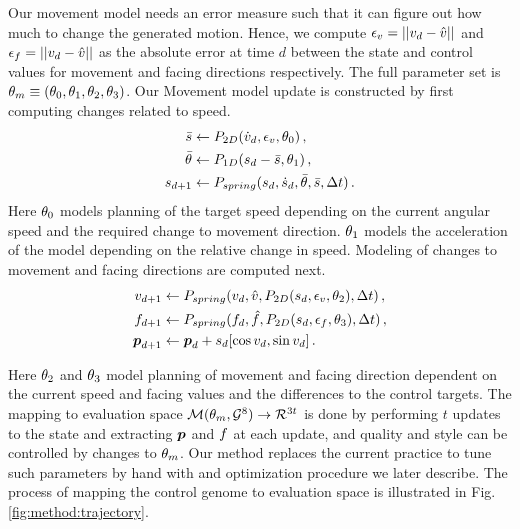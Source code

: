 Our movement model needs an error measure such that it can figure out how much to change the generated motion. Hence, we compute $\epsilon_v=||v_d-\hat{v}||$ and $\epsilon_f=||v_d-\hat{v}||$ as the absolute error at time $d$ between the state and control values for movement and facing directions respectively. 
%
The full parameter set is $\theta_{m}\equiv(\theta_0,\theta_1,\theta_2,\theta_3)$. 
%
Our Movement model update is constructed by first computing  changes related to speed. 
\begin{subequations}
\begin{align}
    \bar{s}&\leftarrow{}P_{2D}({\dot{v}}_d,\epsilon_v,\theta_0)
    \,,\\
    \bar{\theta}&\leftarrow{}P_{1D}(s_d-\bar{s}, \theta_1)
    \,,\\
    s_{d+1}&\leftarrow{}P_{spring}(s_d,\dot{s}_d,\bar{\theta},\bar{s},\Delta{t})
    \,.
\end{align}
\end{subequations}
Here $\theta_0$  models planning of the target speed depending on the current angular speed and the required change to movement direction. $\theta_1$ models the acceleration of the model depending on the relative change in speed.
%
Modeling of changes to movement and facing directions are computed next.
\begin{subequations}
    \begin{align}
        v_{d+1}&\leftarrow P_{spring}(v_d,\hat{v},P_{2D}(s_{d},\epsilon_v, \theta_2),\Delta{t})
        \,,\\
        f_{d+1}&\leftarrow P_{spring}(f_d,\hat{f},P_{2D}(s_{d},\epsilon_f, \theta_3),\Delta{t})
        \,,\\
        \boldsymbol{p }_{d+1}&\leftarrow{}\boldsymbol{p }_d+s_{d}[\cos{v_d},\sin{v_d}]
        \,.
    \end{align}
\end{subequations}

Here $\theta_2$ and $\theta_3$ model planning of movement and facing direction dependent on the current speed and facing values and the differences to the control targets.
%
The mapping to evaluation space $\mathcal{M}(\theta_{m}, \mathcal{G}^{8}) \rightarrow \mathcal{R}^{3t}$ is done by performing $t$ updates to the state and extracting $\boldsymbol{p }$ and $f$ at each update, and quality and style can be controlled by changes to $\theta_{m}$. Our method replaces the current practice to tune such parameters by hand with and optimization procedure we later describe. The process of mapping the control genome to evaluation space is illustrated in Fig. \ref{fig:method:trajectory}. 


